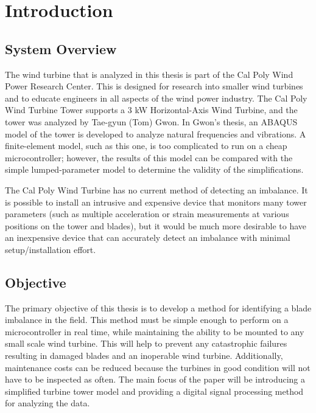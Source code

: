 \chapter{Introduction} %

\label{ch_introduction} %

\section{System Overview}

The wind turbine that is analyzed in this thesis is part of the Cal Poly Wind Power Research Center.  This is designed for research into smaller wind turbines and to educate engineers in all aspects of the wind power industry.  The Cal Poly Wind Turbine Tower supports a 3 kW Horizontal-Axis Wind Turbine, and the tower was analyzed by Tae-gyun (Tom) Gwon\cite{Gwon_paper}.  In Gwon’s thesis, an ABAQUS model of the tower is developed to analyze natural frequencies and vibrations.  A finite-element model, such as this one, is too complicated to run on a cheap microcontroller; however, the results of this model can be compared with the simple lumped-parameter model to determine the validity of the simplifications.

The Cal Poly Wind Turbine has no current method of detecting an imbalance.  It is possible to install an intrusive and expensive device that monitors many tower parameters (such as multiple acceleration or strain measurements at various positions on the tower and blades), but it would be much more desirable to have an inexpensive device that can accurately detect an imbalance with minimal setup/installation effort.


\section{Objective}

The primary objective of this thesis is to develop a method for identifying a blade imbalance in the field.  This method must be simple enough to perform on a microcontroller in real time, while maintaining the ability to be mounted to any small scale wind turbine.   This will help to prevent any catastrophic failures resulting in damaged blades and an inoperable wind turbine.  Additionally, maintenance costs can be reduced because the turbines in good condition will not have to be inspected as often.  The main focus of the paper will be introducing a simplified turbine tower model and providing a digital signal processing method for analyzing the data.

